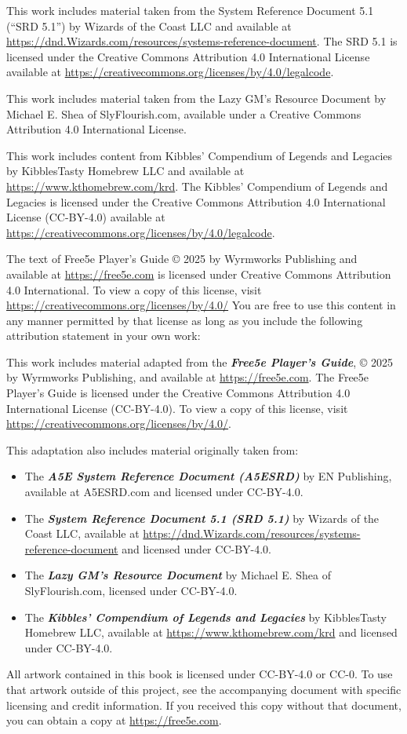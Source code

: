 This work includes material taken from the System Reference Document 5.1
(``SRD 5.1'') by Wizards of the Coast LLC and available at
\url{https://dnd.Wizards.com/resources/systems-reference-document}. The
SRD 5.1 is licensed under the Creative Commons Attribution 4.0
International License available at
\url{https://creativecommons.org/licenses/by/4.0/legalcode}.

This work includes material taken from the Lazy GM's Resource Document
by Michael E. Shea of SlyFlourish.com, available under a Creative
Commons Attribution 4.0 International License.

This work includes content from Kibbles' Compendium of Legends and
Legacies by KibblesTasty Homebrew LLC and available at
\url{https://www.kthomebrew.com/krd}. The Kibbles' Compendium of Legends
and Legacies is licensed under the Creative Commons Attribution 4.0
International License (CC-BY-4.0) available at
\url{https://creativecommons.org/licenses/by/4.0/legalcode}.

The text of Free5e Player's Guide © 2025 by Wyrmworks Publishing and
available at \url{https://free5e.com} is licensed under Creative Commons
Attribution 4.0 International. To view a copy of this license, visit
\url{https://creativecommons.org/licenses/by/4.0/} You are free to use
this content in any manner permitted by that license as long as you
include the following attribution statement in your own work:

This work includes material adapted from the \textbf{\emph{Free5e
Player's Guide}}, © 2025 by Wyrmworks Publishing, and available at
\url{https://free5e.com}. The Free5e Player's Guide is licensed under
the Creative Commons Attribution 4.0 International License (CC-BY-4.0).
To view a copy of this license, visit
\url{https://creativecommons.org/licenses/by/4.0/}.

This adaptation also includes material originally taken from:

\begin{itemize}
\item
  The \textbf{\emph{A5E System Reference Document (A5ESRD)}} by EN
  Publishing, available at A5ESRD.com and licensed under CC-BY-4.0.
\item
  The \textbf{\emph{System Reference Document 5.1 (SRD 5.1)}} by Wizards
  of the Coast LLC, available at
  \url{https://dnd.Wizards.com/resources/systems-reference-document} and
  licensed under CC-BY-4.0.
\item
  The \textbf{\emph{Lazy GM's Resource Document}} by Michael E. Shea of
  SlyFlourish.com, licensed under CC-BY-4.0.
\item
  The \textbf{\emph{Kibbles' Compendium of Legends and Legacies}} by
  KibblesTasty Homebrew LLC, available at
  \url{https://www.kthomebrew.com/krd} and licensed under CC-BY-4.0.
\end{itemize}

All artwork contained in this book is licensed under CC-BY-4.0 or CC-0.
To use that artwork outside of this project, see the accompanying
document with specific licensing and credit information. If you received
this copy without that document, you can obtain a copy at
\url{https://free5e.com}.
